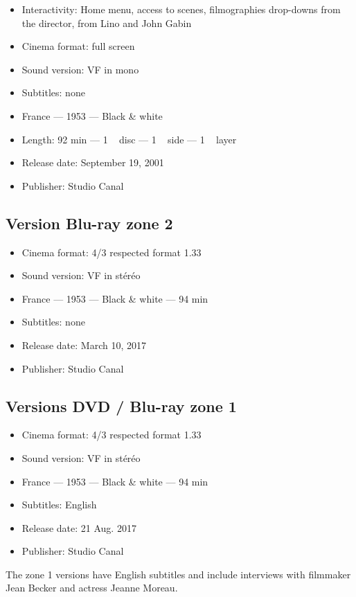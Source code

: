 \begin{itemize}
    \item Interactivity: Home menu, access to scenes, filmographies drop-downs from the director, from Lino  and John \familyname Gabin{}
    \item Cinema format: full screen
    \item Sound version: VF in mono
    \item Subtitles: none
    \item France --- 1953 --- Black \& white
    \item Length: 92 min --- 1 ~ disc --- 1 ~ side --- 1 ~ layer
    \item Release date: September 19, 2001
    \item Publisher: Studio Canal
\end{itemize}

\subsection*{Version Blu-ray zone 2}

\begin{itemize}
	\item Cinema format: 4/3 respected format 1.33
	\item Sound version: VF in stéréo
	\item France --- 1953 --- Black \& white --- 94 min
	\item Subtitles: none
	\item Release date: March 10, 2017
	\item Publisher: Studio Canal
\end{itemize}

\subsection*{Versions DVD / Blu-ray zone 1}

\begin{itemize}
	\item Cinema format: 4/3 respected format 1.33
	\item Sound version: VF in stéréo
	\item France --- 1953 --- Black \& white --- 94 min
	\item Subtitles: English
	\item Release date: 21 Aug. 2017
	\item Publisher: Studio Canal
\end{itemize}

The zone 1 versions have English subtitles and include interviews with filmmaker Jean Becker and actress Jeanne Moreau.

